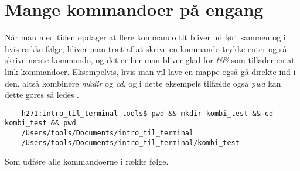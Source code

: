 \chapter{Mange kommandoer på engang}
Når man med tiden opdager at flere kommando tit bliver ud ført sammen og i hvis række følge, bliver man træt af at skrive en kommando trykke enter og så skrive næste kommando, og det er her man bliver glad for \textit{\&\&} som tillader en at link kommandoer.
Eksempelvis, hvis man vil lave en mappe også gå direkte ind i den, altså kombinere \textit{mkdir} og \textit{cd}, og i dette eksempels tilfælde også \textit{pwd} kan dette gøres så ledes .
\begin{lstlisting}
	h271:intro_til_terminal tools$ pwd && mkdir kombi_test && cd kombi_test && pwd
	/Users/tools/Documents/intro_til_terminal
	/Users/tools/Documents/intro_til_terminal/kombi_test 
\end{lstlisting}
Som udføre alle kommandoerne i række følge. 
